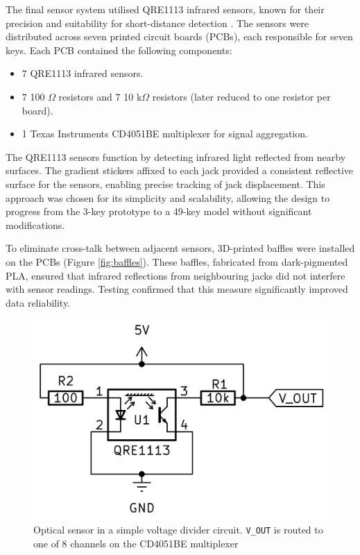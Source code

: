 The final sensor system utilised QRE1113 infrared sensors, known for their precision and suitability for short-distance detection \cite{McPherson2013, McPherson2019}. The sensors were distributed across seven printed circuit boards (PCBs), each responsible for seven keys. Each PCB contained the following components:

\begin{itemize}
    \item 7 QRE1113 infrared sensors.
    \item 7 100 $\Omega$ resistors and 7 10 k$\Omega$ resistors (later reduced to one resistor per board).
    \item 1 Texas Instruments CD4051BE multiplexer for signal aggregation.
\end{itemize}

The QRE1113 sensors function by detecting infrared light reflected from nearby surfaces. The gradient stickers affixed to each jack provided a consistent reflective surface for the sensors, enabling precise tracking of jack displacement. This approach was chosen for its simplicity and scalability, allowing the design to progress from the 3-key prototype to a 49-key model without significant modifications.

To eliminate cross-talk between adjacent sensors, 3D-printed baffles were installed on the PCBs (Figure \ref{fig:baffles}). These baffles, fabricated from dark-pigmented PLA, ensured that infrared reflections from neighbouring jacks did not interfere with sensor readings. Testing confirmed that this measure significantly improved data reliability.

\begin{figure}  
  \centering
  \includegraphics[width=\linewidth]{src/images/simple-schematic-bw-.jpg} 
  \caption{Optical sensor in a simple voltage divider circuit. \texttt{V\_OUT} is routed to one of 8 channels on the CD4051BE multiplexer}
  \Description{} 
  \label{fig:simple-schematic}
\end{figure}

